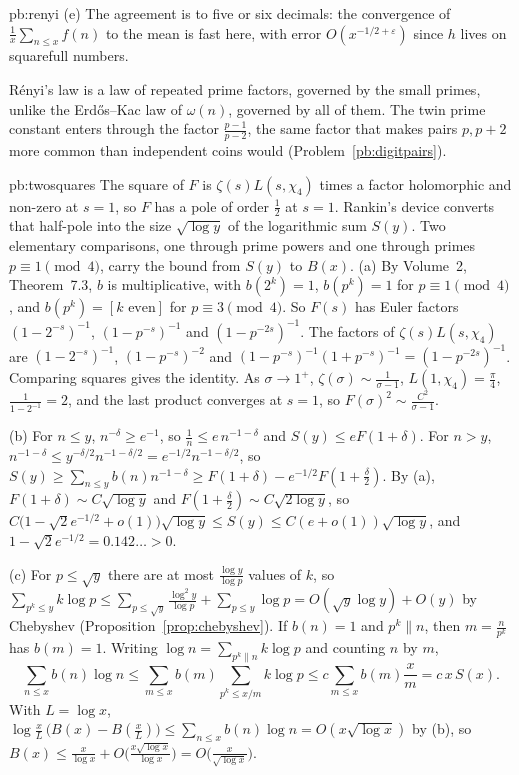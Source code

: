 \begin{solution}{pb:renyi}
(e) The agreement is to five or six decimals: the convergence of $\frac1x\sum_{n\le x}f(n)$ to the mean is fast here, with error $O(x^{-1/2+\varepsilon})$ since $h$ lives on squarefull numbers.

\leads R\'enyi's law is a law of repeated prime factors, governed by the small primes, unlike the Erd\H os--Kac law of $\omega(n)$, governed by all of them. The twin prime constant enters
through the factor $\frac{p-1}{p-2}$, the same factor that makes pairs $p,p+2$ more common than independent coins would (Problem~\ref{pb:digitpairs}).
\end{solution}

\begin{solution}{pb:twosquares}
\idea The square of $F$ is $\zeta(s)L(s,\chi_4)$ times a factor holomorphic and non-zero at $s=1$, so $F$ has a pole of order $\frac12$ at $s=1$. Rankin's device converts that half-pole into the size $\sqrt{\log y}$ of the logarithmic sum $S(y)$. Two elementary comparisons, one through prime powers and one through primes $p\equiv1\pmod4$, carry the bound from $S(y)$ to $B(x)$.
\writeup (a) By Volume~2, Theorem~7.3, $b$ is multiplicative, with $b(2^k)=1$, $b(p^k)=1$ for $p\equiv1\pmod4$, and $b(p^k)=[k\text{ even}]$ for $p\equiv3\pmod4$. So $F(s)$ has Euler
factors $(1-2^{-s})^{-1}$, $(1-p^{-s})^{-1}$ and $(1-p^{-2s})^{-1}$. The factors of $\zeta(s)L(s,\chi_4)$ are $(1-2^{-s})^{-1}$, $(1-p^{-s})^{-2}$ and $(1-p^{-s})^{-1}(1+p^{-s})^{-1}=(1-p^{-2s})^{-1}$.
Comparing squares gives the identity. As $\sigma\to1^+$, $\zeta(\sigma)\sim\frac1{\sigma-1}$, $L(1,\chi_4)=\frac\pi4$, $\frac1{1-2^{-1}}=2$, and the last product converges at $s=1$, so
$F(\sigma)^2\sim\frac{C^2}{\sigma-1}$.

(b) For $n\le y$, $n^{-\delta}\ge e^{-1}$, so $\frac1n\le e\,n^{-1-\delta}$ and $S(y)\le eF(1+\delta)$. For $n>y$, $n^{-1-\delta}\le y^{-\delta/2}n^{-1-\delta/2}=e^{-1/2}n^{-1-\delta/2}$, so
$S(y)\ge\sum_{n\le y}b(n)n^{-1-\delta}\ge F(1+\delta)-e^{-1/2}F(1+\frac\delta2)$. By (a), $F(1+\delta)\sim C\sqrt{\log y}$ and $F(1+\frac\delta2)\sim C\sqrt{2\log y}$, so
$C\bigl(1-\sqrt2e^{-1/2}+o(1)\bigr)\sqrt{\log y}\le S(y)\le C(e+o(1))\sqrt{\log y}$, and $1-\sqrt2e^{-1/2}=0.142\ldots>0$.

(c) For $p\le\sqrt y$ there are at most $\frac{\log y}{\log p}$ values of $k$, so $\sum_{p^k\le y}k\log p\le\sum_{p\le\sqrt y}\frac{\log^2y}{\log p}+\sum_{p\le y}\log p=O(\sqrt y\log y)+O(y)$
by Chebyshev (Proposition~\ref{prop:chebyshev}). If $b(n)=1$ and $p^k\parallel n$, then $m=\frac n{p^k}$ has $b(m)=1$. Writing $\log n=\sum_{p^k\parallel n}k\log p$ and counting $n$ by $m$,
\[
\sum_{n\le x}b(n)\log n\le\sum_{m\le x}b(m)\sum_{p^k\le x/m}k\log p\le c\sum_{m\le x}b(m)\frac xm=c\,x\,S(x).
\]
With $L=\log x$, $\log\frac xL\,\bigl(B(x)-B(\frac xL)\bigr)\le\sum_{n\le x}b(n)\log n=O(x\sqrt{\log x})$ by (b), so $B(x)\le\frac x{\log x}+O\bigl(\frac{x\sqrt{\log x}}{\log x}\bigr)=O\bigl(\frac x{\sqrt{\log x}}\bigr)$.


\end{solution}
